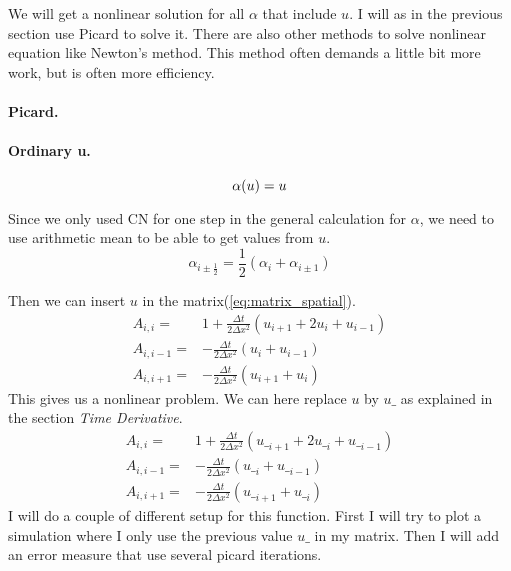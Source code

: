 \documentclass{book}
\begin{document}
We will get a nonlinear solution for all $\alpha$ that include $u$. 
I will as in the previous section use Picard to solve it. There are also
other methods to solve nonlinear equation like Newton's method. This method often demands
a little bit more work, but is often more efficiency. 

\paragraph{Picard.}

\paragraph{Ordinary u.}
\begin{equation}
	\alpha(u) = u\\
\end{equation}

Since we only used CN for one step in the general calculation for $\alpha$, we need to use arithmetic mean
to be able to get values from $u$.
\begin{equation*}
	\alpha_{i\pm\frac{1}{2}} =\frac{1}{2}(\alpha_i+\alpha_{i\pm1}) 
\end{equation*}

Then we can insert $u$ in the matrix(\ref{eq:matrix_spatial}).
\begin{align*} 
A_{i,i} =& 1+\frac{\Delta t}{2\Delta x^2}(u_{i+1}+2u_{i}+u_{i-1})\\
A_{i,i-1} =&-\frac{\Delta t}{2\Delta x^2}(u_{i}+u_{i-1})\\
A_{i,i+1} =&-\frac{\Delta t}{2\Delta x^2}(u_{i+1}+u_{i})
\end{align*}                               
This gives us a nonlinear problem. We can here replace $u$ by $u\_$
as explained in the section \emph{Time Derivative}.
\begin{align*} 
A_{i,i} =& 1+\frac{\Delta t}{2\Delta x^2}(u\__{i+1}+2u\__{i}+u\__{i-1})\\
A_{i,i-1} =&-\frac{\Delta t}{2\Delta x^2}(u\__{i}+u\__{i-1})\\
A_{i,i+1} =&-\frac{\Delta t}{2\Delta x^2}(u\__{i+1}+u\__{i})
\end{align*}                               
I will do a couple of different setup for this function. First I will try to plot
a simulation where I only use the previous value $u\_$ in my matrix. Then I will add
an error measure that use several picard iterations.

\end{document}
